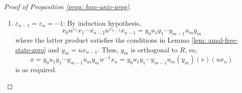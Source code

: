 \documentclass{amsart}
\theoremstyle{definition}
\begin{document}
\begin{proof}[Proof of Proposition \ref{prop: hnn-univ-prop}]
\begin{enumerate}
\begin{equation*}
        \end{equation*}
        is as required.
        \item $\varepsilon_{n-1} = \varepsilon_n = -1$: By induction hypothesis,
        \begin{equation*}
            x_0w^{\varepsilon_1}x_1\cdots x_{n-2}w^{\varepsilon_{n-1}}x_{n-1} = y_0u_1y_1 \cdots y_{m-1}u_my_m
        \end{equation*}
        where the latter product satisfies the conditions in Lemma \ref{lem: amal-free-state-zero} and $y_m = ux_{n-1}$. Thus, $y_m$ is orthogonal to $R$, so,
        \begin{equation*}
            x = y_0u_1y_1 \cdots y_{m-1}u_my_mw^{-1}x_n = y_0u_1y_1 \cdots y_{m-1}u_m(y_m)(v)(ux_n)
        \end{equation*}
        is as required.
    \end{enumerate}
\end{proof}
\end{document}
